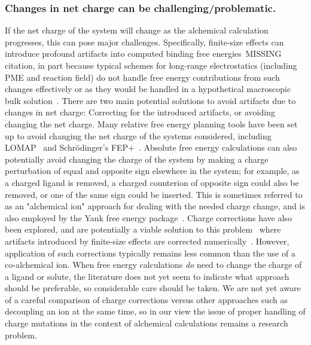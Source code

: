 \documentclass[9pt,bestpractices]{livecoms}
\begin{document}
\subsubsection{Changes in net charge can be challenging/problematic.}
If the net charge of the system will change as the alchemical calculation progresses, this can pose major challenges.
Specifically, finite-size effects can introduce profound artifacts into computed binding free energies~\cite{}MISSING citation, in part because typical schemes for long-range electrostatics (including PME and reaction field) do not handle free energy contributions from such changes effectively or as they would be handled in a hypothetical macroscopic bulk solution~\cite{}.
%
There are two main potential solutions to avoid artifacts due to changes in net charge: Correcting for the introduced artifacts, or avoiding changing the net charge.
%
Many relative free energy planning tools have been set up to avoid changing the net charge of the systems considered, including LOMAP~\cite{liu2013lead} and Schr\"{o}dinger's FEP+~\cite{wang2015accurate}. Absolute free energy calculations can also potentially avoid changing the charge of the system by making a charge perturbation of equal and opposite sign elsewhere in the system; for example, as a charged ligand is removed, a charged counterion of opposite sign could also be removed, or one of the same sign could be inserted. This is sometimes referred to as an "alchemical ion" approach for dealing with the needed charge change, and is also employed by the Yank free energy package~\cite{wang2013identifying}.
Charge corrections have also been explored, and are potentially a viable solution to this problem~\cite{mey2018impact} where artifacts introduced by finite-size effects are corrected numerically~\cite{chen2018accurate}. However, application of such corrections typically remains less common than the use of a co-alchemical ion.
%
When free energy calculations \emph{do} need to change the charge of a ligand or solute, the literature does not yet seem to indicate what approach should be preferable, so considerable care should be taken.
We are not yet aware of a careful comparison of charge corrections versus other approaches such as decoupling an ion at the same time, so in our view the issue of proper handling of charge mutations in the context of alchemical calculations remains a research problem.
%
\end{document}

